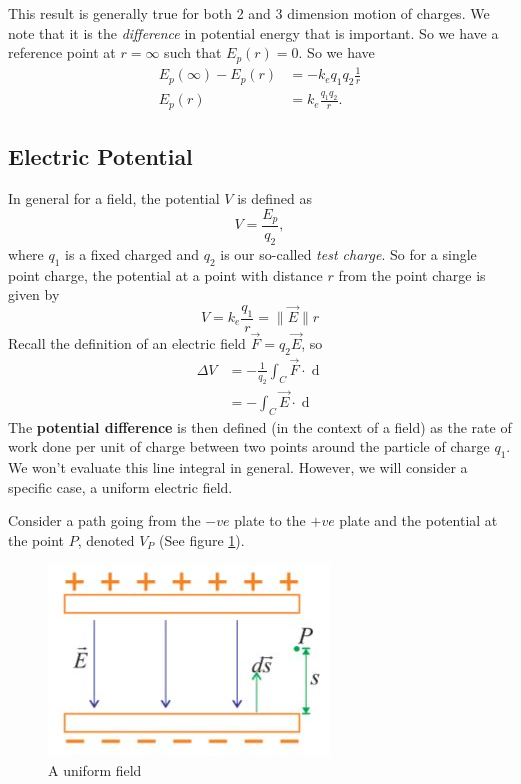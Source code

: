 This result is generally true for both 2 and 3 dimension motion of charges. We note that it is the \textit{difference} in potential energy that is important. So we have a reference point at $r = \infty$ such that $E_p (r) = 0$. So we have
\begin{align}
    E_{p}(\infty) - E_p (r) &= - k_e q_1 q_2 \frac{1}{r} \\ 
    E_p (r) &= k_e \frac{q_1 q_2}{r}.
\end{align}

\subsection{Electric Potential}

In general for a field, the potential $V$ is defined as 
\begin{equation}
    V = \frac{E_p}{q_2},
\end{equation}
where $q_1$ is a fixed charged and $q_2$ is our so-called \textit{test charge}. So for a single point charge, the potential at a point with distance $r$ from the point charge is given by
\begin{equation}
    V = k_e \frac{q_1}{r} = \| \vec{E} \|r
\end{equation}
Recall the definition of an electric field $\vec{F} = q_2 \vec{E}$, so 
\begin{align}
    \label{eq:change-in-potential}
    \Delta V &= - \frac{1}{q_2} \int_C \vec{F} \cdot \mathop{\mathrm{d}\vec{s}} \\
    &= - \int_C \vec{E} \cdot \mathop{\mathrm{d}\vec{s}}
\end{align}
The \textbf{potential difference} is then defined (in the context of a field) as the rate of work done per unit of charge between two points around the particle of charge $q_1$. We won't evaluate this line integral in general. However, we will consider a specific case, a uniform electric field. 

Consider a path going from the $-ve$ plate to the $+ve$ plate and the potential at the point $P$, denoted $V_P$ (See figure \ref{fig:uniform-field-derivation}). 

\begin{figure}[h!]
    \centering
    \includegraphics{notes/images/Uniform-Field-Derivation.JPG}
    \caption{A uniform field}
    \label{fig:uniform-field-derivation}
\end{figure}
\FloatBarrier

